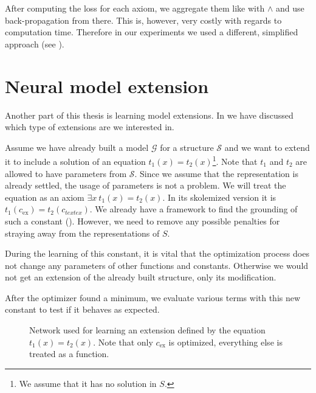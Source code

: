 After computing the loss for each axiom, we aggregate them like with $\wedge$ and use back-propagation from there. This is, however, very costly with regards to computation time. Therefore in our experiments we used a different, simplified approach (see ).

\section{Neural model extension}
Another part of this thesis is learning model extensions. In  we have discussed which type of extensions are we interested in.

Assume we have already built a model $\mathcal{G}$ for a structure $\mathcal{S}$ and we want to extend it to include a solution of an equation $t_1(x)=t_2(x)$\footnote{We assume that it has no solution in $S$.}. Note that $t_1$ and $t_2$ are allowed to have parameters from $\mathcal{S}$. Since we assume that the representation is already settled, the usage of parameters is not a problem. We will treat the equation as an axiom $\exists x\ t_1(x)=t_2(x)$. In its skolemized version it is $t_1(c_{\text{ex}})= t_2(c_{text{ex}})$. We already have a framework to find the grounding of such a constant (). However, we need to remove any possible penalties for straying away from the representations of $S$. 

During the learning of this constant, it is vital that the optimization process does not change any parameters of other functions and constants. Otherwise we would not get an  extension of the already built structure, only its modification. 

After the optimizer found a minimum, we evaluate various terms with this new constant to test if it behaves as expected.

\begin{figure}
\caption{Network used for learning an extension defined by the equation $t_1(x)=t_2(x)$. Note that only $c_{\text{ex}}$ is optimized, everything else is treated as a function.}
\centering
\label{learning_extension}
\end{figure}

